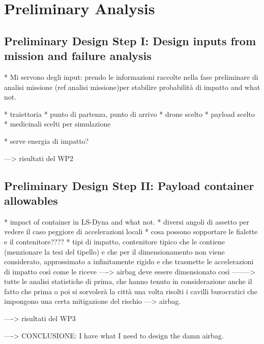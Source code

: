 \chapter{Preliminary Analysis}
\label{chapter-PreliminaryAnalysis}



\section{Preliminary Design Step I: Design inputs from mission and failure analysis}
* Mi servono degli input: prendo le informazioni raccolte nella fase preliminare di analisi missione (ref analisi missione)per stabilire probabilità di impatto and what not. 

* traiettoria
* punto di partenza, punto di arrivo
* drone scelto
* payload scelto
* medicinali scelti per simulazione

* serve energia di impatto?

---> risultati del WP2


\section{Preliminary Design Step II: Payload container allowables}

* impact of container in LS-Dyna and what not. 
* diversi angoli di assetto per vedere il caso peggiore di accelerazioni locali
* cosa  possono sopportare le fialette e il contenitore????
* tipi di impatto, contenitore tipico che le contiene (menzionare la tesi del tipello) e che per il dimensionamento non viene considerato, approssimato a infinitamente rigido e che trasmette le accelerazioni di impatto così come le riceve ----> airbag deve essere dimensionato così
--------> tutte le analisi statistiche di prima, che hanno tenuto in considerazione anche il fatto che prima o poi si sorvolerà la città una volta risolti i cavilli burocratici che impongono una certa mitigazione del rischio ---> airbag. 



----> risultati del WP3



----> CONCLUSIONE: I have what I need to design the damn airbag. 


